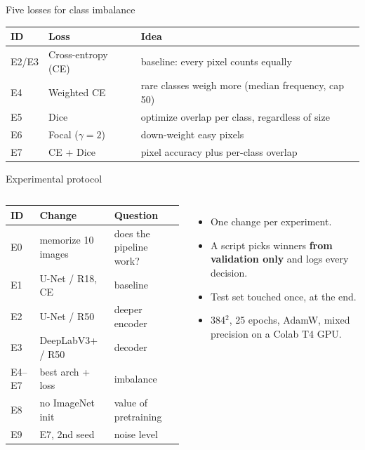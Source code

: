 \documentclass[aspectratio=169,11pt]{beamer}
\newcommand{\takeaway}[1]{\par\vspace{3pt}{\color{trail}\rule{\linewidth}{0.6pt}}\par\vspace{1pt}{\large #1}}
\begin{document}
\begin{frame}{Five losses for class imbalance}
\begin{center}
\renewcommand{\arraystretch}{1.25}
\begin{tabular}{@{}lll@{}}
\toprule
ID & Loss & Idea \\
\midrule
E2/E3 & Cross-entropy (CE) & baseline: every pixel counts equally \\
E4 & Weighted CE & rare classes weigh more (median frequency, cap 50) \\
E5 & Dice & optimize overlap per class, regardless of size \\
E6 & Focal ($\gamma=2$) & down-weight easy pixels \\
E7 & CE + Dice & pixel accuracy plus per-class overlap \\
\bottomrule
\end{tabular}
\end{center}
\takeaway{Weights come from the training split only. Void pixels are ignored.}
\end{frame}

\begin{frame}{Experimental protocol}
\begin{columns}[T]
\small
\begin{tabular}{@{}lll@{}}
\toprule
ID & Change & Question \\
\midrule
E0 & memorize 10 images & does the pipeline work? \\
E1 & U-Net / R18, CE & baseline \\
E2 & U-Net / R50 & deeper encoder \\
E3 & DeepLabV3+ / R50 & decoder \\
E4--E7 & best arch + loss & imbalance \\
E8 & no ImageNet init & value of pretraining \\
E9 & E7, 2nd seed & noise level \\
\bottomrule
\end{tabular}
\begin{itemize}\setlength\itemsep{6pt}
  \item One change per experiment.
  \item A script picks winners \textbf{from validation only} and logs every decision.
  \item \alert{Test set touched once}, at the end.
  \item 384$^2$, 25 epochs, AdamW, mixed precision on a Colab T4 GPU.
\end{itemize}
\end{columns}
\end{frame}
\end{document}
